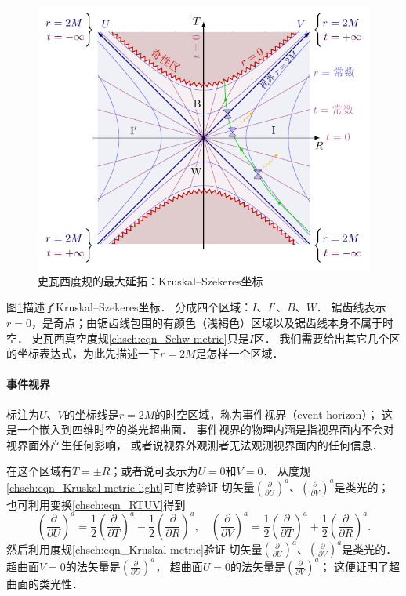 \begin{figure}[htb]
    \centering
    \includegraphics[width=15cm]{fig/II6-Kruskal.pdf}
    \caption{史瓦西度规的最大延拓：Kruskal--Szekeres坐标
        \protect\footnotemark[9] } \label{chsch:fig_Kruskal}
\end{figure}
{}






图\ref{chsch:fig_Kruskal}描述了Kruskal--Szekeres坐标．
分成四个区域：$I$、$I'$、$B$、$W$．
锯齿线表示$r=0$，是奇点；由锯齿线包围的有颜色（浅褐色）区域以及锯齿线本身不属于时空．
史瓦西真空度规\eqref{chsch:eqn_Schw-metric}只是$I$区．
我们需要给出其它几个区的坐标表达式，为此先描述一下$r=2M$是怎样一个区域．

\paragraph{事件视界}\label{chsch:sec_event-horizon}
标注为$U$、$V$的坐标线是$r=2M$的时空区域，称为{\heiti 事件视界}（event horizon）；
这是一个嵌入到四维时空的类光超曲面．
事件视界的物理内涵是指视界面内不会对视界面外产生任何影响，
或者说视界外观测者无法观测视界面内的任何信息．

在这个区域有$T=\pm R$；或者说可表示为$U=0$和$V=0$．
从度规\eqref{chsch:eqn_Kruskal-metric-light}可直接验证
切矢量$(\frac{\partial}{\partial U})^a$、$(\frac{\partial}{\partial V})^a$是类光的；
也可利用变换\eqref{chsch:eqn_RTUV}得到
\begin{equation*}
    \left(\frac{\partial}{\partial U}\right)^a = 
    \frac{1}{2} \left(\frac{\partial}{\partial T}\right)^a-
    \frac{1}{2} \left(\frac{\partial}{\partial R}\right)^a,\quad
    \left(\frac{\partial}{\partial V}\right)^a = 
    \frac{1}{2} \left(\frac{\partial}{\partial T}\right)^a+
    \frac{1}{2} \left(\frac{\partial}{\partial R}\right)^a.
\end{equation*}
然后利用度规\eqref{chsch:eqn_Kruskal-metric}验证
切矢量$(\frac{\partial}{\partial U})^a$、$(\frac{\partial}{\partial V})^a$是类光的．
超曲面$V=0$的法矢量是$(\frac{\partial}{\partial U})^a$，
超曲面$U=0$的法矢量是$(\frac{\partial}{\partial V})^a$；
这便证明了超曲面的类光性．

